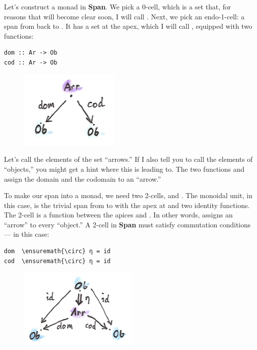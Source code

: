Let's construct a monad in \textbf{Span}. We pick a 0-cell, which is a
set that, for reasons that will become clear soon, I will call
. Next, we pick an endo-1-cell: a span from  back
to . It has a set at the apex, which I will call ,
equipped with two functions:

\begin{Verbatim}[commandchars=\\\{\}]
dom :: Ar -> Ob
cod :: Ar -> Ob
\end{Verbatim}

\begin{figure}[H]
\centering
\includegraphics[width=1.91667in]{images/spanmonad.png}
\end{figure}

\noindent
Let's call the elements of the set  ``arrows.'' If I also
tell you to call the elements of  ``objects,'' you might get
a hint where this is leading to. The two functions  and
 assign the domain and the codomain to an ``arrow.''

To make our span into a monad, we need two 2-cells,  and
. The monoidal unit, in this case, is the trivial span from
 to  with the apex at  and two identity
functions. The 2-cell  is a function between the apices
 and . In other words,  assigns an
``arrow'' to every ``object.'' A 2-cell in \textbf{Span} must satisfy
commutation conditions --- in this case:

\begin{Verbatim}[commandchars=\\\{\}]
dom  \ensuremath{\circ} η = id
cod  \ensuremath{\circ} η = id
\end{Verbatim}

\begin{figure}[H]
\centering
\includegraphics[width=2.27083in]{images/spanunit.png}
\end{figure}

